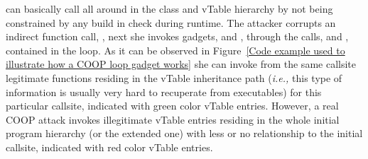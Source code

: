 can basically call all around in the class and vTable hierarchy by not being constrained by any build in check during
runtime. The attacker corrupts an indirect function call, , 
next she invokes gadgets,   and , 
through the calls,  and , contained in the loop. 
As it can be observed in Figure~\ref{Code example used to illustrate how a COOP loop gadget works} she 
can invoke from the same callsite legitimate functions residing in the vTable inheritance path
(\textit{i.e.,} this type of information is usually very hard to recuperate from executables)
for this particular callsite, indicated with green color vTable entries. 
However, a real COOP attack invokes illegitimate
vTable entries residing in the whole initial program hierarchy (or the extended one)
with less or no relationship to the initial callsite,
indicated with red color vTable entries.

